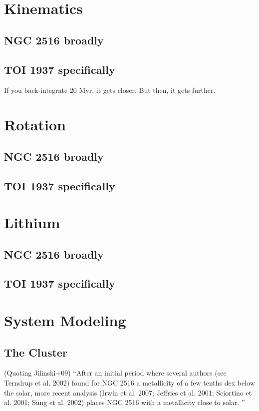 \documentclass[12pt,twocolumn,tighten]{aastex63}
\begin{document}

\section{Kinematics}

  \subsection{NGC 2516 broadly}
  \subsection{TOI 1937 specifically}
  If you back-integrate 20 Myr, it gets closer. But then, it gets
  further.

\section{Rotation}

  \subsection{NGC 2516 broadly}
  \subsection{TOI 1937 specifically}

\section{Lithium}

  \subsection{NGC 2516 broadly}
  \subsection{TOI 1937 specifically}

\section{System Modeling}
\label{sec:system}

\subsection{The Cluster}
\label{subsec:cluster}

(Quoting Jilinski+09)
``After an initial period where several authors (see Terndrup et al.
2002) found for NGC 2516 a metallicity of a few tenths dex below the
solar, more recent analysis (Irwin et al. 2007; Jeffries et al.  2001;
Sciortino et al. 2001; Sung et al. 2002) places NGC 2516 with a
metallicity close to solar. ''
\end{document}
